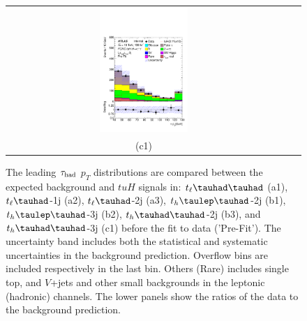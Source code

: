 \begin{figure}[H]
\begin{tabular}{@{}ccc@{}}
\includegraphics[page=1,width=0.33\textwidth]{figures/new_pt/reg2mtau1b3jos_vetobtagwp70_highmet.pdf}&\\
(c1) \\
\end{tabular}
\caption{The leading $\tau_\text{had}$ $p_T$  distributions are compared between the expected background and $tuH$ signals in: $t_{\ell}\thadhad$ (a1),  $t_{\ell}\tauhad$-1j (a2),  $t_{\ell}\tauhad$-2j (a3), $t_h\tlhad$-2j (b1), $t_h\tlhad$-3j (b2), $t_h\thadhad$-2j (b3), and $t_h\thadhad$-3j (c1) before the fit to data ('Pre-Fit'). The uncertainty band includes both the statistical and systematic uncertainties in the background prediction. Overflow bins are included respectively in the last bin. Others (Rare) includes single top, and $V$+jets and other small backgrounds in the leptonic (hadronic) 
channels. 
The lower panels show the ratios of the data to the background prediction.}
\label{fig:taupt_prefit}
\end{figure}




